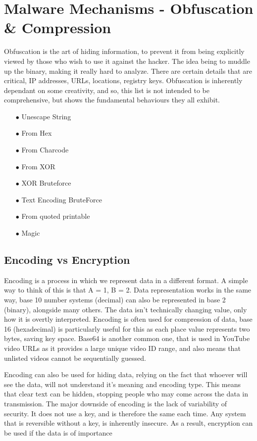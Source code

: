 \chapter{Malware Mechanisms - Obfuscation \& Compression}
Obfuscation is the art of hiding information, to prevent it from being explicitly viewed by those who wish to use it against the hacker. The idea being to muddle up the binary, making it really hard to analyze. There are certain details that are critical, IP addresses, URLs, locations, registry keys. Obfuscation is inherently dependant on some creativity, and so,
this list is not intended to be comprehensive, but shows the fundamental behaviours they all exhibit.
\begin{enumerate}
    \item [$\bullet$] Unescape String
    \item [$\bullet$] From Hex
    \item [$\bullet$] From Charcode
    \item [$\bullet$] From XOR
    \item [$\bullet$] XOR Bruteforce
    \item [$\bullet$] Text Encoding BruteForce
    \item [$\bullet$] From quoted printable
    \item [$\bullet$] Magic
\end{enumerate}


\section{Encoding vs Encryption}
Encoding is a process in which we represent data in a different format. A simple way to think of this is that A = 1, B = 2. Data representation works in the same way,
base 10 number systems (decimal) can also be represented in base 2 (binary), alongside many others. The data isn't technically changing value, only how it is overtly interpreted.
Encoding is often used for compression of data, base 16 (hexadecimal) is particularly useful for this as each place value represents two bytes, saving key space. Base64 is another common one, that is used in
YouTube video URLs as it provides a large unique video ID range, and also means that unlisted videos cannot be sequentially guessed.

Encoding can also be used for hiding data, relying on the fact that whoever will see the data, will not understand it's meaning and encoding type.
This means that clear text can be hidden, stopping people who may come across the data in transmission. The major downside of encoding is the lack of variability of security.
It does not use a key, and is therefore the same each time. Any system that is reversible without a key, is inherently insecure. As a result, encryption can be used if the data is of importance


